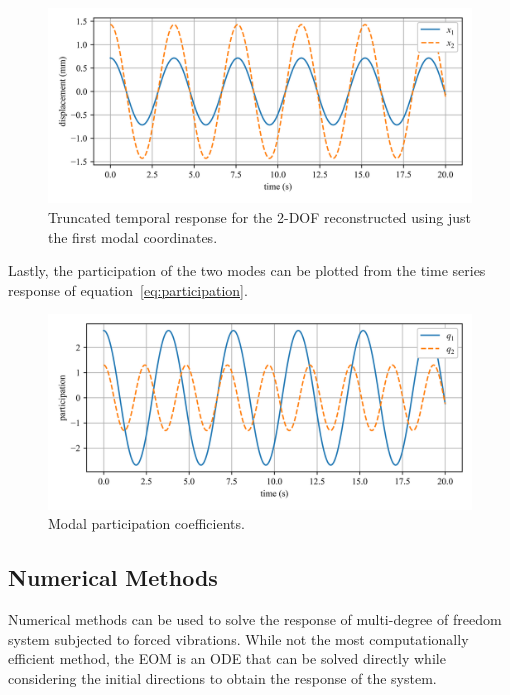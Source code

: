 \documentclass[12pt,letter]{article}
\begin{document}
\begin{example}
	\begin{figure}[H]
		\centering
		\includegraphics[width=\linewidth]{../figures/modal_analysis_free_vibration_truncated.png}
		\caption{Truncated temporal response for the 2-DOF reconstructed using just the first modal coordinates.}
		\label{fig:modal_analysis_free_vibration_truncated}
	\end{figure}
	
	Lastly, the participation of the two modes can be plotted from the time series response of equation~\ref{eq:participation}.
	
	\begin{figure}[H]
		\centering
		\includegraphics[width=\linewidth]{../figures/modal_analysis_free_participation_factors.png}
		\caption{Modal participation coefficients.}
		\label{fig:modal_analysis_free_participation_factors}
	\end{figure}
	
	
	
	\end{example}
	
		\subsection{Numerical Methods}
		
			Numerical methods can be used to solve the response of multi-degree of freedom system subjected to forced vibrations. While not the most computationally efficient method, the EOM is an ODE that can be solved directly while considering the initial directions to obtain the response of the system. 
			
\end{document}
